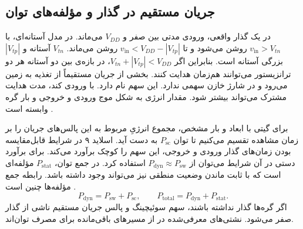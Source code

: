 \subsection{جریان مستقیم در گذار و مؤلفه‌های توان}
\label{sec:power-short-circuit}

در یک گذار واقعی، ورودی  مدتی بین صفر و \(V_{DD}\)
می‌ماند. در مدل آستانه‌ای،  با \(v_{\mathrm{in}}>V_{tn}\)
روشن می‌شود و  تا \(v_{\mathrm{in}}<V_{DD}-|V_{tp}|\)
روشن می‌ماند. \(V_{tn}\) آستانه  و \(|V_{tp}|\) بزرگی
آستانه  است. بنابراین اگر \(V_{tn}+|V_{tp}|<V_{DD}\)،
در بازه‌ی بین دو آستانه هر دو ترانزیستور می‌توانند هم‌زمان هدایت کنند.
بخشی از جریان مستقیماً از تغذیه به زمین می‌رود و در شارژ خازن سهمی
ندارد. این سهم  نام دارد. با ورودی کند،
مدت هدایت مشترک می‌تواند بیشتر شود. مقدار انرژی به شکل موج ورودی
و خروجی و بار گره وابسته است \cite[بخش ، صفحه ۱۹۳]{weste}
\cite[اسلاید ۹]{powerslides}.

برای گیتی با ابعاد و بار مشخص، مجموع انرژیِ مربوط به این پالس‌های
جریان را بر زمان مشاهده تقسیم می‌کنیم تا توان \(P_{\mathrm{sc}}\)
به دست آید.
اسلاید ۹ در شرایط قابل‌مقایسه بودن زمان‌های گذار ورودی و خروجی، این
سهم را کوچک برآورد می‌کند. برای برآورد دستی در آن شرایط می‌توان از
\(P_{\mathrm{dyn}}\approx P_{\mathrm{sw}}\) استفاده کرد. در جمع
توان، \(P_{\mathrm{stat}}\) مؤلفه‌ای است که با ثابت ماندن وضعیت منطقی
نیز می‌تواند وجود داشته باشد. رابطه جمع مؤلفه‌ها چنین است
\cite[بخش ، صفحات ۱۸۴ و ۱۸۵]{weste}
\cite[اسلاید ۱۰]{powerslides}.
\begin{equation}
  P_{\mathrm{dyn}}=P_{\mathrm{sw}}+P_{\mathrm{sc}},\qquad
  P_{\mathrm{total}}=P_{\mathrm{dyn}}+P_{\mathrm{stat}}.
  \label{eq:power-components}
\end{equation}
اگر گره‌ها گذار نداشته باشند، سهم سوئیچینگ و پالس جریان مستقیم ناشی
از گذار صفر می‌شود. نشتی‌های معرفی‌شده در
 از مسیرهای باقی‌مانده
برای مصرف توان‌اند.
